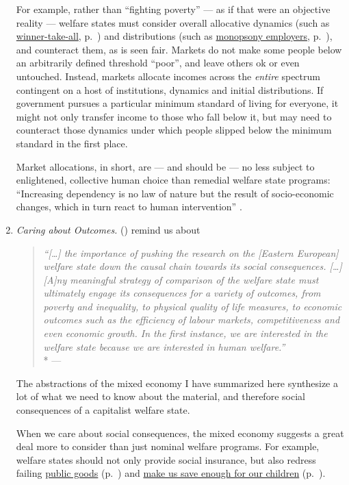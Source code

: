 \begin{enumerate}
	For example, rather than ``fighting poverty'' --- as if that were an objective reality --- welfare states must consider overall allocative dynamics (such as \hyperref[sec:winner-take-all]{winner-take-all}, p.~\pageref{sec:winner-take-all}) and distributions (such as \hyperref[sec:monopsony-employers]{monopsony employers}, p.~\pageref{sec:monopsony-employers}), and counteract them, as is seen fair.
Markets do not make some people below an arbitrarily defined threshold ``poor'', and leave others ok or even untouched.
Instead, markets allocate incomes across the \emph{entire} spectrum contingent on a host of institutions, dynamics and initial distributions.
If government pursues a particular minimum standard of living for everyone, it might not only transfer income to those who fall below it, but may need to counteract those dynamics under which people slipped below the minimum standard in the first place.

	Market allocations, in short, are --- and should be --- no less subject to enlightened, collective human choice than remedial welfare state programs:
	``Increasing dependency is no law of nature but the result of socio-economic changes, which in turn react to human intervention'' \citep[x]{Esping-Andersen2002}.

	\item \emph{Caring about Outcomes.} \citeauthor{Haggard2009} (\citeyear[236]{Haggard2009}) remind us about
	\begin{quote}
		\emph{``[\ldots]
		the importance of pushing the research on the [Eastern European] welfare state down the causal chain towards its social consequences.
		[\ldots]
		[A]ny meaningful strategy of comparison of the welfare state must ultimately engage its consequences for a variety of outcomes, from poverty and inequality, to physical quality of life measures, to economic outcomes such as the efficiency of labour markets, competitiveness and even economic growth.
		In the first instance, we are interested in the welfare state because we are interested in human welfare.''}
		\\*
		--- \citet*[236]{Haggard2009}
	\end{quote}

	The abstractions of the mixed economy I have summarized here synthesize a lot of what we need to know about the material, and therefore social consequences of a capitalist welfare state.

	When we care about social consequences, the mixed economy suggests a great deal more to consider than just nominal welfare programs.
For example, welfare states should not only provide social insurance, but also redress failing \hyperref[sec:public-good]{public goods} (p.~\pageref{sec:public-good}) and \hyperref[sec:long-term-inconsistency]{make us save enough for our children} (p.~\pageref{sec:long-term-inconsistency}).


\end{enumerate}
